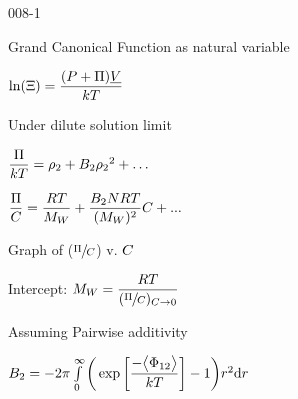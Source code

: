 \begin{mitframe}{008-1}
\begin{listone}
\begin{listtwo}
\begin{listthree}
			\item Grand Canonical Function as natural variable
            
			\begin{listfour}
				
                \item $\ln(\gcpf) = \dfrac{(\p + \osmpress)\uline{\vol}}{\thermcond\Temp} $
                
    		\end{listfour}
            
			\item Under dilute solution limit
    			\begin{listfour}
                
				\item $\dfrac{\osmpress}{\thermcond\Temp} = \dens_{2} + \virialcoeff{2}{\dens_{2}}^2 + \hdots $
                
				\item $\dfrac{\osmpress}{\conc} = \dfrac{R\Temp}{\mw} + \dfrac{\virialcoeff{2}\nummoles \gasconst\Temp}{(\mw)^2}\conc + ...$
                
				\begin{listfive}
                
					\item Graph of ($\sfrac{\osmpress}{\conc}$) v. $\conc$
					
                    \begin{listsix}
                    
						\item Intercept: $\mw = \dfrac{\gasconst\Temp}{(\sfrac{\osmpress}{\conc})_{\conc\rightarrow\init}}$
    					
                     \end{listsix}
                     
				\end{listfive}
                
			\end{listfour}
            
			\item Assuming Pairwise additivity
            
			\begin{listfour}
            
				\item $\virialcoeff{2} = -2\pi\int\limits_{\init}^{\infty}\bigg(\exp\bigg[\dfrac{-\big\langle\pot_{12}\big\rangle}{\thermcond\Temp}\bigg]-1\bigg)\pos^2 \mathrm{d}\pos$
				

\end{listfour}
\end{listthree}
\end{listtwo}
\end{listone}
\end{mitframe}
